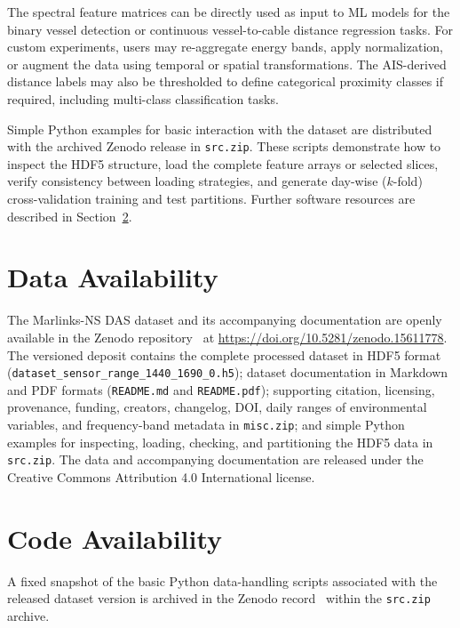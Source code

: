 \documentclass[11pt]{article}
\begin{document}
The spectral feature matrices can be directly used as input to ML models for the binary vessel detection or continuous vessel-to-cable distance regression tasks. For custom experiments, users may re-aggregate energy bands, apply normalization, or augment the data using temporal or spatial transformations. The AIS-derived distance labels may also be thresholded to define categorical proximity classes if required, including multi-class classification tasks.

Simple Python examples for basic interaction with the dataset are distributed with the archived Zenodo release in \texttt{src.zip}. These scripts demonstrate how to inspect the HDF5 structure, load the complete feature arrays or selected slices, verify consistency between loading strategies, and generate day-wise ($k$-fold) cross-validation training and test partitions. Further software resources are described in Section~\ref{sec:code availability}.


\section{Data Availability}
\label{sec:data-availability}

The Marlinks-NS DAS dataset and its accompanying documentation are openly available in the Zenodo repository~\cite{ramirez2024dasvesseldataset} at \url{https://doi.org/10.5281/zenodo.15611778}. The versioned deposit contains the complete processed dataset in HDF5 format (\texttt{dataset\_sensor\_range\_1440\_1690\_0.h5}); dataset documentation in Markdown and PDF formats (\texttt{README.md} and \texttt{README.pdf}); supporting citation, licensing, provenance, funding, creators, changelog, DOI, daily ranges of environmental variables, and frequency-band metadata in \texttt{misc.zip}; and simple Python examples for inspecting, loading, checking, and partitioning the HDF5 data in \texttt{src.zip}. The data and accompanying documentation are released under the Creative Commons Attribution 4.0 International license.


\section{Code Availability}
\label{sec:code availability}

A fixed snapshot of the basic Python data-handling scripts associated with the released dataset version is archived in the Zenodo record~\cite{ramirez2024dasvesseldataset} within the \texttt{src.zip} archive.
\end{document}
